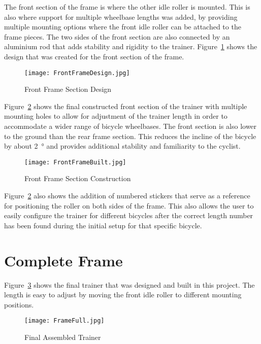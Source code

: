 The front section of the frame is where the other idle roller is mounted. This is also where support for multiple wheelbase lengths was added, by providing multiple mounting options where the front idle roller can be attached to the frame pieces. The two sides of the front section are also connected by an aluminium rod that adds stability and rigidity to the trainer. Figure~\ref{fig:FrontDesign} shows the design that was created for the front section of the frame.

\begin{figure}[H]
	\centering
	\texttt{[image: FrontFrameDesign.jpg]}
	\caption{Front Frame Section Design}
	\label{fig:FrontDesign}
\end{figure}

\vspace*{-0.5cm}

Figure~\ref{fig:FrontBuilt} shows the final constructed front section of the trainer with multiple mounting holes to allow for adjustment of the trainer length in order to accommodate a wider range of bicycle wheelbases. The front section is also lower to the ground than the rear frame section. This reduces the incline of the bicycle by about \SI{2}{\degree} and provides additional stability and familiarity to the cyclist.

\begin{figure}[H]
	\centering
	\texttt{[image: FrontFrameBuilt.jpg]}
	\caption{Front Frame Section Construction}
	\label{fig:FrontBuilt}
\end{figure}

\vspace*{-0.5cm}

Figure~\ref{fig:FrontBuilt} also shows the addition of numbered stickers that serve as a reference for positioning the roller on both sides of the frame. This also allows the user to easily configure the trainer for different bicycles after the correct length number has been found during the initial setup for that specific bicycle.

\section{Complete Frame}

Figure~\ref{fig:1} shows the final trainer that was designed and built in this project. The length is easy to adjust by moving the front idle roller to different mounting positions.

\begin{figure}[H]
	\centering
	\texttt{[image: FrameFull.jpg]}
	\caption{Final Assembled Trainer}
	\label{fig:1}
\end{figure}

